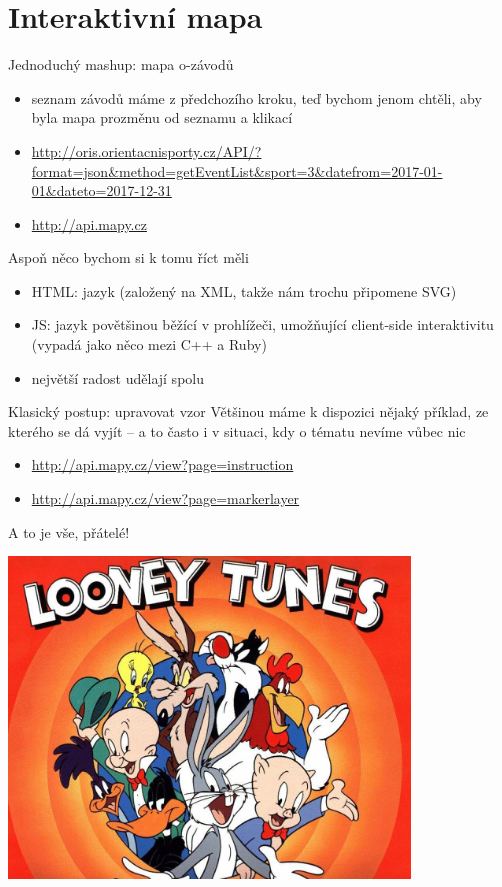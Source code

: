 \documentclass{beamer}
\begin{document}
\section{Interaktivní mapa}

\begin{frame}{Jednoduchý mashup: mapa o-závodů}
  \begin{itemize}
    \item seznam závodů máme z předchozího kroku, teď bychom jenom chtěli, aby byla mapa prozměnu od seznamu a klikací
    \item {\tiny \url{http://oris.orientacnisporty.cz/API/?format=json\&method=getEventList\&sport=3\&datefrom=2017-01-01\&dateto=2017-12-31}}
    \item {\tiny \url{http://api.mapy.cz}}
  \end{itemize}
\end{frame}

\begin{frame}{Aspoň něco bychom si k tomu říct měli}
  \begin{itemize}
    \item HTML: jazyk (založený na XML, takže nám trochu připomene SVG)
    \item JS: jazyk povětšinou běžící v prohlížeči, umožňující client-side interaktivitu (vypadá jako něco mezi C++ a Ruby)
    \item největší radost udělají spolu
  \end{itemize}
\end{frame}

\begin{frame}{Klasický postup: upravovat vzor}
  Většinou máme k dispozici nějaký příklad, ze kterého se dá vyjít – a to často i v situaci, kdy o tématu nevíme vůbec nic
  \begin{itemize}
    \item {\tiny \url{http://api.mapy.cz/view?page=instruction}}
    \item {\tiny \url{http://api.mapy.cz/view?page=markerlayer}}
  \end{itemize}
\end{frame}

\begin{frame}{A to je vše, přátelé!}
  \begin{center}
    \includegraphics[width=0.8\textwidth]{looney_tunes}
  \end{center}
\end{frame}
\end{document}
